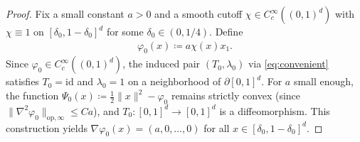 \documentclass[11pt,reqno]{amsart}
\theoremstyle{definition}
\begin{document}
\begin{proof}
Fix a small constant $a>0$ and a smooth cutoff $\chi\in C^\infty_c((0,1)^d)$ with $\chi\equiv 1$ on $[\delta_0,1-\delta_0]^d$ for some $\delta_0\in(0,1/4)$. Define
\begin{align}
    \label{eq:base-potential}
    \varphi_0(x) \coloneqq a \chi(x) x_1.
\end{align}
Since $\varphi_0\in C^\infty_c((0,1)^d)$, the induced pair $(T_0,\lambda_0)$ via \eqref{eq:convenient} satisfies $T_0=\mathrm{id}$ and $\lambda_0=1$ on a neighborhood of $\partial[0,1]^d$. For $a$ small enough, the function $\Psi_0(x) \coloneqq \frac1{2}\|x\|^2-\varphi_0$ remains strictly convex (since $\|\nabla^2 \varphi_0\|_{\mathrm{op},\infty}\le Ca$), and $T_0:[0,1]^d\to[0,1]^d$ is a diffeomorphism. This construction yields $\nabla \varphi_0(x)=(a,0,\dots,0)$ for all $x \in [\delta_0,1-\delta_0]^d$.


\end{proof}
\end{document}

